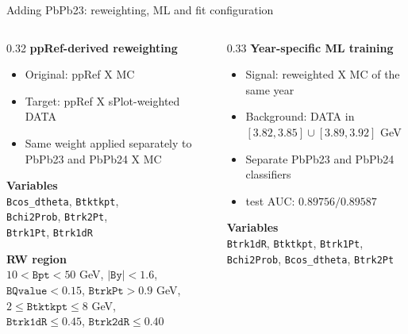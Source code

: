 \documentclass[11pt,aspectratio=169]{beamer}
\begin{document}
\begin{frame}[label=p9]{Adding PbPb23: reweighting, ML and fit configuration}
  \scriptsize
  \begin{columns}[T,onlytextwidth]
    \begin{column}{0.32\textwidth}
      \textbf{ppRef-derived reweighting}
      \begin{itemize}
        \setlength{\itemsep}{0.08em}
        \item Original: ppRef X MC
        \item Target: ppRef X sPlot-weighted DATA
        \item Same weight applied separately to PbPb23 and PbPb24 X MC
      \end{itemize}
      \textbf{Variables}\\[-0.10em]
      \texttt{Bcos\_dtheta}, \texttt{Btktkpt},\\
      \texttt{Bchi2Prob}, \texttt{Btrk2Pt},\\
      \texttt{Btrk1Pt}, \texttt{Btrk1dR}

      \vspace{0.20em}
      \textbf{RW region}\\[-0.10em]
      $10<\texttt{Bpt}<50$ GeV, $|\texttt{By}|<1.6$,\\
      $\texttt{BQvalue}<0.15$, $\texttt{BtrkPt}>0.9$ GeV,\\
      $2\leq\texttt{Btktkpt}\leq8$ GeV,\\
      $\texttt{Btrk1dR}\leq0.45$, $\texttt{Btrk2dR}\leq0.40$
    \end{column}

    \begin{column}{0.33\textwidth}
      \textbf{Year-specific ML training}
      \begin{itemize}
        \setlength{\itemsep}{0.08em}
        \item Signal: reweighted X MC of the same year
        \item Background: DATA in $[3.82,3.85]\cup[3.89,3.92]$ GeV
        \item Separate PbPb23 and PbPb24 classifiers
        \item test AUC: $0.89756/0.89587$
      \end{itemize}
      \textbf{Variables}\\[-0.10em]
      \texttt{Btrk1dR}, \texttt{Btktkpt}, \texttt{Btrk1Pt},\\
      \texttt{Bchi2Prob}, \texttt{Bcos\_dtheta}, \texttt{Btrk2Pt}


\end{column}
\end{columns}
\end{frame}
\end{document}
